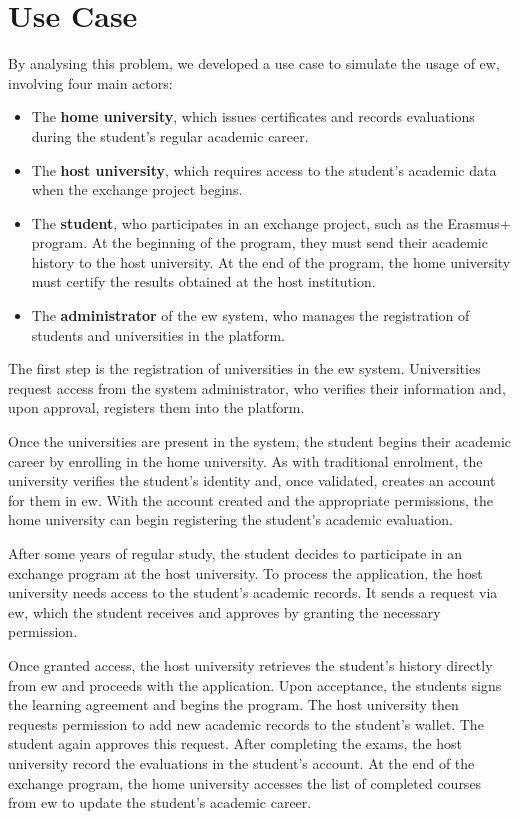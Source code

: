 \section{Use Case}
By analysing this problem, we developed a use case to simulate the usage of \gls{ew}, involving four main actors:
\begin{itemize}
    \item The \textbf{home university}, which issues certificates and records evaluations during the student's regular academic career.
    \item The \textbf{host university}, which requires access to the student's academic data when the exchange project begins.
    \item The \textbf{student}, who participates in an exchange project, such as the Erasmus+ program. At the beginning of the program, they must send their academic history to the host university. At the end of the program, the home university must certify the results obtained at the host institution.
    \item The \textbf{administrator} of the \gls{ew} system, who manages the registration of students and universities in the platform.
\end{itemize}
The first step is the registration of universities in the \gls{ew} system. Universities request access from the system administrator, who verifies their information and, upon approval, registers them into the platform.

Once the universities are present in the system, the student begins their academic career by enrolling in the home university. As with traditional enrolment, the university verifies the student's identity and, once validated, creates an account for them in \gls{ew}. With the account created and the appropriate permissions, the home university can begin registering the student's academic evaluation.

After some years of regular study, the student decides to participate in an exchange program at the host university. To process the application, the host university needs access to the student's academic records. It sends a request via \gls{ew}, which the student receives and approves by granting the necessary permission.

Once granted access, the host university retrieves the student's history directly from \gls{ew} and proceeds with the application. Upon acceptance, the students signs the learning agreement and begins the program. The host university then requests permission to add new academic records to the student's wallet. The student again approves this request.
After completing the exams, the host university record the evaluations in the student's account. At the end of the exchange program, the home university accesses the list of completed courses from \gls{ew} to update the student's academic career.

